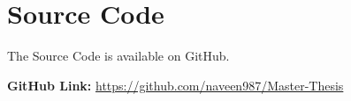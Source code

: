 \chapter{Source Code} %
\label{Source Code} %


\noindent The Source Code is available on GitHub. 

\noindent\textbf{GitHub Link:} \href{https://github.com/naveen987/Master-Thesis}{https://github.com/naveen987/Master-Thesis}